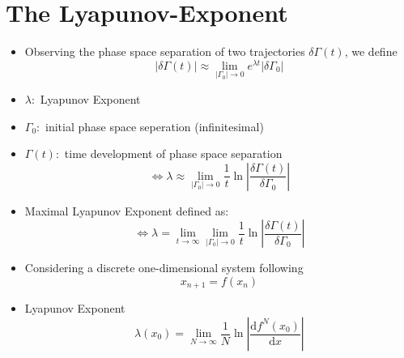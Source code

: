 \documentclass[ignorenonframetext]{beamer}
\begin{document}
\section*{The Lyapunov-Exponent}
\begin{frame}
\begin{itemize}
\item Observing the phase space separation of two trajectories $\delta\Gamma(t)$, we define
\begin{equation}
\left|\delta\Gamma(t)\right|\approx \lim\limits_{\left|\Gamma_0\right| \rightarrow0} e^{\lambda t}\left|\delta\Gamma_0\right|
\end{equation}
\item $\lambda:$ Lyapunov Exponent
\item $\Gamma_0:$ initial phase space seperation (infinitesimal)
\item $\Gamma(t):$ time development of phase space separation 
\begin{equation}
\Leftrightarrow \lambda\approx \lim\limits_{\left|\Gamma_0\right| \rightarrow0} \frac{1}{t}\ln\left|\frac{\delta\Gamma(t)}{\delta\Gamma_0}\right|
\end{equation}
\end{itemize}
\end{frame}

\begin{frame}
\begin{itemize}
\item Maximal Lyapunov Exponent defined as:
\begin{equation}
\Leftrightarrow \lambda = \lim\limits_{t \rightarrow \infty} \lim\limits_{\left|\Gamma_0\right| \rightarrow0}  \frac{1}{t}\ln\left|\frac{\delta\Gamma(t)}{\delta\Gamma_0}\right|
\end{equation}
\item Considering a discrete one-dimensional system following
\begin{equation}
x_{n+1}=f(x_n)
\end{equation}
\item Lyapunov Exponent
\begin{equation}
\lambda(x_0)=\lim\limits_{N\rightarrow\infty} \frac{1}{N} \ln\left|\frac{\mathrm{d}f^N(x_0)}{\mathrm{d}x}\right|
\end{equation}
\end{itemize}
\end{frame}
\end{document}

